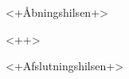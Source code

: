 \documentclass[a4paper,foldmarks=false,fromalign=right]{scrlttr2}
\begin{document}
\begin{letter}{}
  \opening{<+Åbningshilsen+>}
  <++>
\closing{<+Afslutningshilsen+>}
\end{letter}
\end{document}
